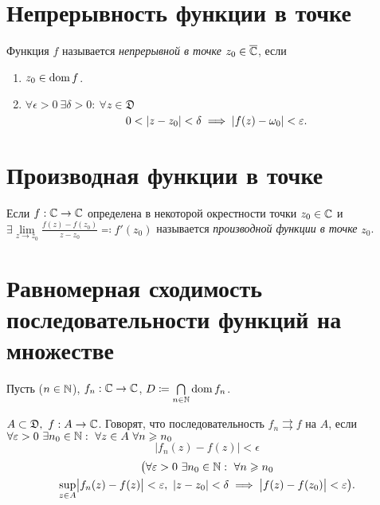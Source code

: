 \section{Непрерывность функции в точке}

\begin{definition}
	Функция $f$ называется \emph{непрерывной в точке} $z_0 \in \overline{\mathbb{C}}$, если
	\begin{enumerate}
		\item $z_0 \in \operatorname{dom} f$.
		\item $\forall \epsilon > 0 \ \exists \delta > 0: \ \forall z \in \mathfrak{D}$
		      \[
			      0 < \left\lvert z - z_0\right\rvert < \delta \implies \left\lvert f(z) - \omega_0\right\rvert < \varepsilon.
		      \]
	\end{enumerate}
\end{definition}

\section{Производная функции в точке}

\begin{definition}
	Если $f: \mathbb{C} \rightarrow \mathbb{C}$ определена в некоторой окрестности точки $z_0 \in \mathbb{C}$ и $\exists \underset{z \rightarrow z_0}{\lim}\frac{f(z) - f(z_0)}{z - z_0} \eqqcolon f'(z_0)$ называется \emph{производной функции в точке} $z_0$.
\end{definition}

\newpage

\section{Равномерная сходимость последовательности функций на множестве}

\begin{definition}
	Пусть ($n\in \mathbb{N}$), $f_n : \mathbb{C} \rightarrow \mathbb{C}$, $D \coloneq \underset{n \in \mathbb{N}}{\bigcap}\operatorname{dom} f_n$.

	$A \subset \mathfrak{D}, \ f: A \rightarrow \mathbb{C}$. Говорят, что последовательность $f_n \rightrightarrows f$ на $A$, если $\forall \varepsilon> 0 \ \exists n_0 \in \mathbb{N}: \ \forall z \in A \ \forall n \geqslant n_0$
	\[
		\big|f_n(z) - f(z)\big| < \epsilon
	\]
	\begin{multline*}
		\big(\forall \epsilon > 0 \ \exists n_0 \in \N : \ \forall n \geqslant n_0 \\
		\underset{z \in A}{\sup}\big|f_n(z)-f(z)\big| < \epsilon, \ \abs{z-z_0} < \delta \implies \big|f(z) - f(z_0)\big|< \epsilon\big).
	\end{multline*}
\end{definition}

